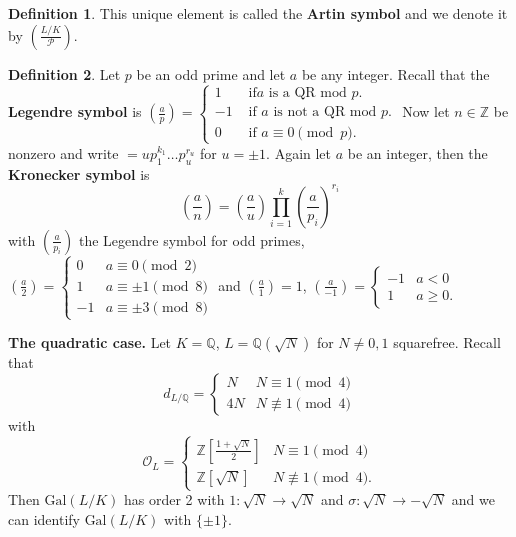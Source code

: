 \documentclass{article}
\theoremstyle{definition}
\newtheorem{defn}{Definition}[section]
\begin{document}
\begin{defn}
    This unique element is called the \textbf{Artin symbol} and we denote it by $\left(\frac{L/K}{\mathcal{P}}\right)$.
\end{defn}
\begin{defn}
    Let $p$ be an odd prime and let $a$ be any integer. Recall that the \textbf{Legendre symbol} is $\left( \frac{a}{p}\right) = \begin{cases}
        1 &\text{ if} a \text{ is a QR mod }p.\\
        -1&\text{ if } a \text{ is not a QR mod }p.\\
        0 &\text{ if }a \equiv 0\pmod{p}.
    \end{cases}$
    Now let $n \in \mathbb{Z}$ be nonzero and write $ = u p_1^{k_1}\ldots p_u^{r_u}$ for $u = \pm 1$. Again let $a$ be an integer, then the \textbf{Kronecker symbol} is \[
    \left(\frac{a}{n}\right) = \left(\frac{a}{u}\right) \prod_{i=1}^{k} \left(\frac{a}{p_i}\right)^{r_i}
    \]
    with $\left(\frac{a}{p_i}\right)$ the Legendre symbol for odd primes, $\left(\frac{a}{2}\right) = \begin{cases}
        0 &a \equiv 0\pmod{2}\\
        1&a \equiv \pm 1 \pmod{8}\\
        -1 &a \equiv \pm 3 \pmod{8}
    \end{cases}$
    and $\left(\frac{a}{1}\right) =1$, $\left(\frac{a}{-1}\right) = \begin{cases}
        -1 & a<0\\
        1 &a\ge 0.
    \end{cases}$
\end{defn}
\textbf{The quadratic case.} Let $K=\mathbb{Q}$, $L = \mathbb{Q}(\sqrt{N})$ for $N\neq 0,1$ squarefree. Recall that \[
d_{L/\mathbb{Q}} = \begin{cases}
    N & N \equiv 1 \pmod{4}\\
    4N& N \not\equiv 1 \pmod{4}
\end{cases}
\]
with \[
\mathcal{O}_L = \begin{cases}
    \mathbb{Z}\left[\frac{1+\sqrt{N}}{2}\right] & N \equiv 1 \pmod{4}\\
    \mathbb{Z}[\sqrt{N}] & N \not\equiv 1\pmod{4}.
\end{cases}
\]
Then $\text{Gal}(L/K)$ has order 2 with $1 : \sqrt{N} \to \sqrt{N}$ and $\sigma: \sqrt{N} \to -\sqrt{N}$ and we can identify $\text{Gal}(L/K)$ with $\{\pm 1\}$. 
\vspace{1mm}
 
\end{document}
